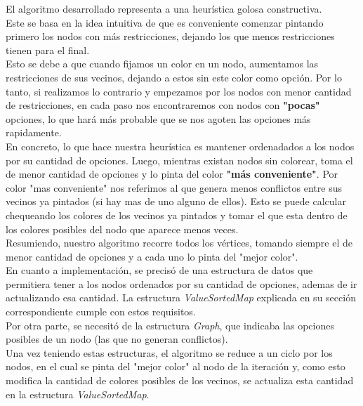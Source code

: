 El algoritmo desarrollado representa a una heurística golosa constructiva.\\ 
Este se basa en la idea intuitiva de que es conveniente comenzar pintando primero los nodos con más restricciones, dejando los que menos restricciones tienen para el final.\\
 
Esto se debe a que cuando fijamos un color en un nodo, aumentamos las restricciones de sus vecinos, dejando a estos sin este color como opción. Por lo tanto, si realizamos lo contrario y empezamos por los nodos con menor cantidad de restricciones, en cada paso nos encontraremos con nodos con \textbf{"pocas"} opciones, lo que hará más probable que se nos agoten las opciones más rapidamente.\\
	 
En concreto, lo que hace nuestra heurística es mantener ordenadados a los nodos por su cantidad de opciones. Luego, mientras existan nodos sin colorear, toma el de menor cantidad de opciones y lo pinta del color \textbf{"más conveniente"}. Por color "mas conveniente" nos referimos al que genera menos conflictos entre sus vecinos ya pintados (si hay mas de uno alguno de ellos). Esto se puede calcular chequeando los colores de los vecinos ya pintados y tomar el que esta dentro de los colores posibles del nodo que aparece menos veces.\\
	 
Resumiendo, nuestro algoritmo recorre todos los vértices, tomando siempre el de menor cantidad de opciones y a cada uno lo pinta del "mejor color".\\

En cuanto a implementación, se precisó de una estructura de datos que permitiera tener a los nodos ordenados por su cantidad de opciones, ademas de ir actualizando esa cantidad. La estructura \textit{ValueSortedMap} explicada en su sección correspondiente cumple con estos requisitos. \\
Por otra parte, se necesitó de la estructura \textit{Graph}, que indicaba las opciones posibles de un nodo (las que no generan conflictos). \\
Una vez teniendo estas estructuras, el algoritmo se reduce a un ciclo por los nodos, en el cual se pinta del "mejor color" al nodo de la iteración y, como esto modifica la cantidad de colores posibles de los vecinos, se actualiza esta cantidad en la estructura \textit{ValueSortedMap}.


